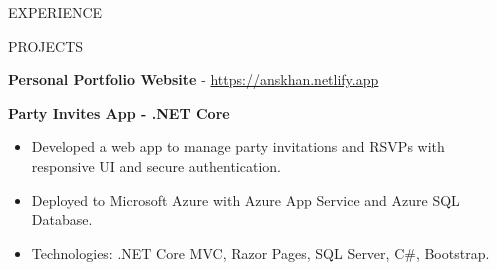 \documentclass{resume} %
\begin{document}
\begin{rSection}{EXPERIENCE}
  
\begin{rSection}{PROJECTS}
\vspace{-1.25em}
\item \textbf{Personal Portfolio Website}  - \href{https://anskhan.netlify.app}{https://anskhan.netlify.app}

\item \textbf{Party Invites App - .NET Core}
\begin{itemize}
	\item Developed a web app to manage party invitations and RSVPs with responsive UI and secure authentication.
	\item Deployed to Microsoft Azure with Azure App Service and Azure SQL Database.
	\item Technologies: .NET Core MVC, Razor Pages, SQL Server, C\#, Bootstrap.
\end{itemize}

\iffalse
\item \textbf{Automated University TimeTable Scheduler - Django}





 {Built a tool to easify the hectic and stressfull process of organization timetabling. Problem needed to solve was to make the process distributed instead of the current centralised timetable scheduling process. Keeping provided features for admin and teachers to solve the problem and create personalized timetables. Implemented two ways to get the final scheduled timetable, i.e. Randomised and personalized timetables}

 
 \begin{itemize}
 	\item Developed a tool using Django to decentralize timetabling, reducing timetable creation time and effort, enhancing organizational efficiency.
 	\item Designed and integrated features for administrators and teachers to create personalized timetables.
 	\item Implemented two scheduling methods:
 	\begin{itemize}
 		\item \textbf{Randomized Scheduling:} Auto-generates timetables without specific preferences.
 		\item \textbf{Personalized Scheduling:} Customizes timetables based on user preferences.
 	\end{itemize}

 	\item Technologies: Django, Python, Django ORM, PyCharm, VS Code, MS SQL server, JavaScript, jQuery, HTML, CSS.
 \end{itemize}
\fi
\end{rSection} 
\end{rSection} 
\end{document}
